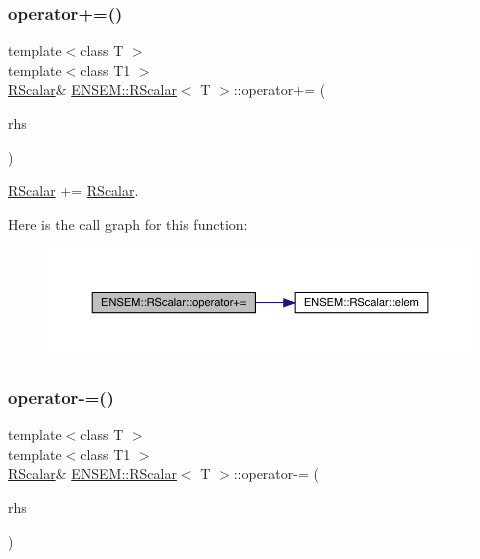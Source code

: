 \subsubsection{\texorpdfstring{operator+=()}{operator+=()}\hspace{0.1cm}{\footnotesize\ttfamily [3/3]}}
{\footnotesize\ttfamily template$<$class T $>$ \\
template$<$class T1 $>$ \\
\mbox{\hyperlink{classENSEM_1_1RScalar}{R\+Scalar}}\& \mbox{\hyperlink{classENSEM_1_1RScalar}{E\+N\+S\+E\+M\+::\+R\+Scalar}}$<$ T $>$\+::operator+= (\begin{DoxyParamCaption}\item[{const \mbox{\hyperlink{classENSEM_1_1RScalar}{R\+Scalar}}$<$ T1 $>$ \&}]{rhs }\end{DoxyParamCaption})\hspace{0.3cm}{\ttfamily [inline]}}



\mbox{\hyperlink{classENSEM_1_1RScalar}{R\+Scalar}} += \mbox{\hyperlink{classENSEM_1_1RScalar}{R\+Scalar}}. 

Here is the call graph for this function\+:
\nopagebreak
\begin{figure}[H]
\begin{center}
\leavevmode
\includegraphics[width=350pt]{d0/d8c/classENSEM_1_1RScalar_adc6bf2610b8af0ab175ef00d9194aa1d_cgraph}
\end{center}
\end{figure}
\mbox{\label{classENSEM_1_1RScalar_a6d158db5ecf3dcc81fe905c6664cac58}} 
\subsubsection{\texorpdfstring{operator-\/=()}{operator-=()}\hspace{0.1cm}{\footnotesize\ttfamily [1/3]}}
{\footnotesize\ttfamily template$<$class T $>$ \\
template$<$class T1 $>$ \\
\mbox{\hyperlink{classENSEM_1_1RScalar}{R\+Scalar}}\& \mbox{\hyperlink{classENSEM_1_1RScalar}{E\+N\+S\+E\+M\+::\+R\+Scalar}}$<$ T $>$\+::operator-\/= (\begin{DoxyParamCaption}\item[{const \mbox{\hyperlink{classENSEM_1_1RScalar}{R\+Scalar}}$<$ T1 $>$ \&}]{rhs }\end{DoxyParamCaption})\hspace{0.3cm}{\ttfamily [inline]}}



